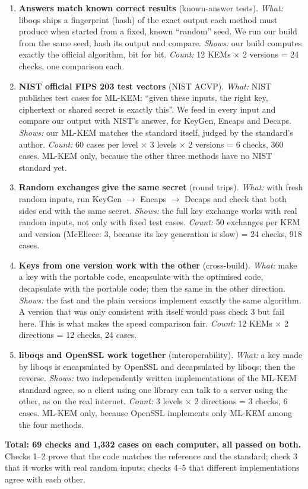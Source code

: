 \documentclass[10pt,a4paper]{article}
\newcommand{\key}[1]{\textbf{#1}}
\begin{document}
\begin{enumerate}[leftmargin=1.4em,itemsep=4pt]
\item \key{Answers match known correct results} (known-answer tests).
\textit{What:} liboqs ships a fingerprint (hash) of the exact output each method must produce when started from a fixed, known ``random'' seed. We run our build from the same seed, hash its output and compare.
\textit{Shows:} our build computes exactly the official algorithm, bit for bit.
\textit{Count:} 12 KEMs × 2 versions = 24 checks, one comparison each.

\item \key{NIST official FIPS 203 test vectors} (NIST ACVP).
\textit{What:} NIST publishes test cases for ML-KEM: ``given these inputs, the right key, ciphertext or shared secret is exactly this''. We feed in every input and compare our output with NIST's answer, for KeyGen, Encaps and Decaps.
\textit{Shows:} our ML-KEM matches the standard itself, judged by the standard's author.
\textit{Count:} 60 cases per level × 3 levels × 2 versions = 6 checks, 360 cases. ML-KEM only, because the other three methods have no NIST standard yet.

\item \key{Random exchanges give the same secret} (round trips).
\textit{What:} with fresh random inputs, run KeyGen $\to$ Encaps $\to$ Decaps and check that both sides end with the same secret.
\textit{Shows:} the full key exchange works with real random inputs, not only with fixed test cases.
\textit{Count:} 50 exchanges per KEM and version (McEliece: 3, because its key generation is slow) = 24 checks, 918 cases.

\item \key{Keys from one version work with the other} (cross-build).
\textit{What:} make a key with the portable code, encapsulate with the optimised code, decapsulate with the portable code; then the same in the other direction.
\textit{Shows:} the fast and the plain versions implement exactly the same algorithm. A version that was only consistent with itself would pass check 3 but fail here. This is what makes the speed comparison fair.
\textit{Count:} 12 KEMs × 2 directions = 12 checks, 24 cases.

\item \key{liboqs and OpenSSL work together} (interoperability).
\textit{What:} a key made by liboqs is encapsulated by OpenSSL and decapsulated by liboqs; then the reverse.
\textit{Shows:} two independently written implementations of the ML-KEM standard agree, so a client using one library can talk to a server using the other, as on the real internet.
\textit{Count:} 3 levels × 2 directions = 3 checks, 6 cases. ML-KEM only, because OpenSSL implements only ML-KEM among the four methods.
\end{enumerate}

\begin{plain}
\key{Total: 69 checks and 1,332 cases on each computer, all passed on both.} Checks 1–2 prove that the code matches the reference and the standard; check 3 that it works with real random inputs; checks 4–5 that different implementations agree with each other.
\end{plain}
\end{document}
